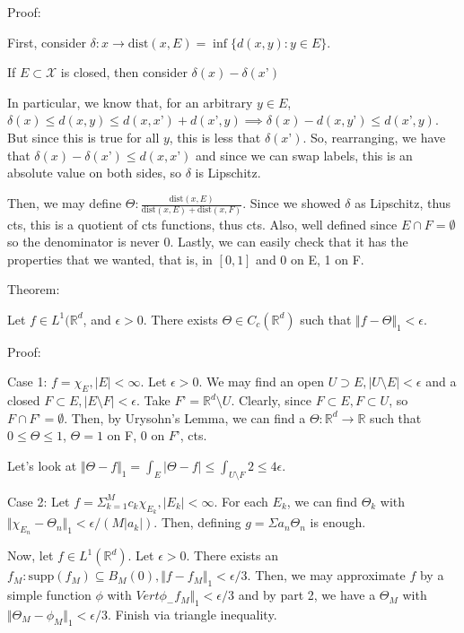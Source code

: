 \documentclass[10pt]{article}
\begin{document}
Proof:

First, consider $\delta: x \to \text{dist}(x,E) = \inf \{ d(x,y) : y \in E \}$.

If $ E \subset \mathcal{X}$ is closed, then consider $\delta(x) - \delta(x’)$

In particular, we know that, for an arbitrary $y \in E$, $\delta(x) \leq d(x,y) \leq d(x,x’) + d(x’,y) \implies \delta(x) - d(x,y’) \leq d(x’,y)$. But since this is true for all $y$, this is less that $\delta(x’)$. So, rearranging, we have that $\delta(x) - \delta(x’) \leq d(x,x’)$ and since we can swap labels, this is an absolute value on both sides, so $\delta$ is Lipschitz.

Then, we may define $\Theta: \frac{ \text{dist}(x,E) }{\text{dist}(x,E) + \text{dist}(x,F)}$. Since we showed $\delta$ as Lipschitz, thus cts, this is a quotient of cts functions, thus cts. Also, well defined since $E \cap F = \emptyset$ so the denominator is never 0. Lastly, we can easily check that it has the properties that we wanted, that is, in $[0,1]$ and 0 on E, 1 on F.

Theorem:

Let $f \in L^1(\mathbb{R}^d$, and $\epsilon > 0$. There exists $\Theta \in C_c(\mathbb{R}^d)$ such that $\Vert f - \Theta \Vert_1 < \epsilon$.

Proof:

Case 1: $f = \chi_E, |E| < \infty$. Let $\epsilon > 0$. We may find an open $U \supset E, |U \setminus E| < \epsilon$ and a closed $F \subset E, |E \setminus F| < \epsilon$. Take $F’ = \mathbb{R}^d \setminus U$. Clearly, since $F \subset E, F \subset  U$, so $F \cap F’ = \emptyset$. Then, by Urysohn’s Lemma, we can find a $\Theta: \mathbb{R}^d \to \mathbb{R}$ such that $0 \leq \Theta \leq 1$, $\Theta = 1$ on F, $0$ on $F’$, cts.

Let’s look at $\Vert \Theta - f \Vert_1 = \int_{E} |\Theta - f| \leq \int_{U \setminus F} 2 \leq 4\epsilon$.

Case 2: Let $f = \Sigma_{k=1}^M c_k \chi_{E_k}, |E_k| < \infty$. For each $E_k$, we can find $\Theta_k$ with $\Vert \chi_{E_n} - \Theta_n \Vert_1 < \epsilon/(M |a_k|)$. Then, defining $g = \Sigma a_n \Theta_n$ is enough. 

Now, let $f \in L^1(\mathbb{R}^d)$. Let $\epsilon > 0$. There exists an $f_M : \text{supp}(f_M) \subseteq B_M(0), \Vert f - f_M \Vert_1 < \epsilon/3$. Then, we may approximate $f$ by a simple function $\phi$ with $Vert \phi_ - f_M \Vert_1 < \epsilon/3$ and by part 2, we have a $\Theta_M$ with $\Vert \Theta_M - \phi_M \Vert_1 < \epsilon/3$. Finish via triangle inequality.
\end{document}
